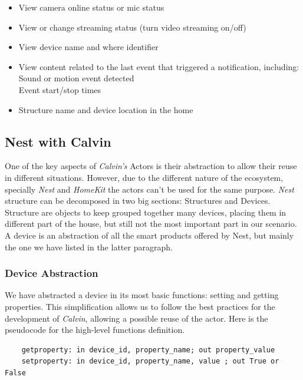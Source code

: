 \begin{itemize}
    \item View camera online status or mic status
    \item View or change streaming status (turn video streaming on/off)
    \item View device name and where identifier
    \item View content related to the last event that triggered a notification, including:
        \\Sound or motion event detected
        \\Event start/stop times
    \item Structure name and device location in the home

\end{itemize}



\subsection{Nest with Calvin}

One of the key aspects of \textit{Calvin's} Actors is their abstraction
to allow their reuse in different situations. However, due to the different
nature of the ecosystem, specially \textit{Nest} and \textit{HomeKit} the actors
can't be used for the same purpose.
\textit{Nest} structure can be decomposed in two big sections: Structures and Devices.
Structure are objects to keep grouped together many devices, placing them in different part of the house,
but still not the most important part in our scenario.\\
A device is an abstraction of all the smart products offered by Nest, but mainly the one we have listed in the latter
paragraph.

\subsubsection{Device Abstraction}

We have abstracted a device in its most basic functions: setting and getting properties.
This simplification allows us to follow the best practices for the development of \textit{Calvin},
allowing a possible reuse of the actor. Here is the pseudocode for the high-level functions definition.

\begin{verbatim}
    getproperty: in device_id, property_name; out property_value
    setproperty: in device_id, property_name, value ; out True or False
\end{verbatim}


